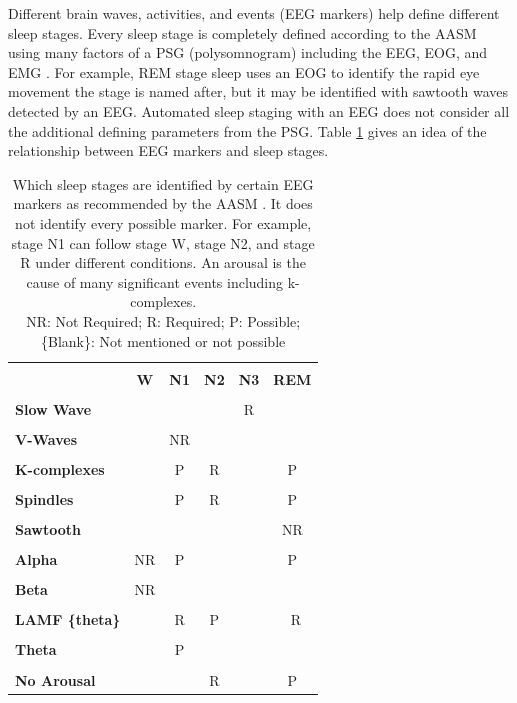 \documentclass[12pt, oneside]{book}
\begin{document}
Different brain waves, activities, and events (EEG markers) help define different sleep stages. Every sleep stage is completely defined according to the AASM using many factors of a PSG (polysomnogram) including the EEG, EOG, and EMG \cite{berry_md_chair_aasm_nodate}. For example, REM stage sleep uses an EOG to identify the rapid eye movement the stage is named after, but it may be identified with sawtooth waves detected by an EEG. Automated sleep staging with an EEG does not consider all the additional defining parameters from the PSG. Table \ref{tab:stagetoWave} gives an idea of the relationship between EEG markers and sleep stages. 

\begin{table}[H]
	{\hspace{0cm}
		\begin{tabular}{|p{3cm}|c|c|c|c|c|}
			\hline \\ [-1.5ex]
			& \textbf{W} & \textbf{N1} & \textbf{N2} & \textbf{N3} & \textbf{REM} \\
			\hline \\ [-1.5ex]
			\textbf{Slow Wave} &  &  &  & R &\\
			\hline \\ [-1.5ex]
			\textbf{V-Waves}  &  & NR &  &  &\\
			\hline \\ [-1.5ex]	 
			\textbf{K-complexes} &  & P & R &  & P\\
			\hline \\ [-1.5ex]
			\textbf{Spindles} &  & P & R &  & P\\
			\hline \\ [-1.5ex]
			\textbf{Sawtooth}&  &  &  &  & NR\\
			\hline \\ [-1.5ex]
			\textbf{Alpha}& NR & P &  &  & P\\
			\hline \\ [-1.5ex]
		    \textbf{Beta} & NR &  &  &  &\\
			\hline \\ [-1.5ex] 
			\textbf{LAMF \{theta\}} &  & R & P &  &  R\\
			\hline \\ [-1.5ex]
			\textbf{Theta} &  & P &  &  & \\
			\hline \\ [-1.5ex]	
			\textbf{No Arousal} &  &  & R &  & P \\
			\hline
		\end{tabular}
	} 
	\caption[Which sleep stages are identified by certain EEG markers as recommended by the AASM \cite{berry_md_chair_aasm_nodate}.]{Which sleep stages are identified by certain EEG markers as recommended by the AASM \cite{berry_md_chair_aasm_nodate}. It does not identify every possible marker. For example, stage N1 can follow stage W, stage N2, and stage R under different conditions. An arousal is the cause of many significant events including k-complexes. \\
	NR: Not Required; R: Required; P: Possible; \{Blank\}: Not mentioned or not possible}
	\label{tab:stagetoWave}
\end{table}
\end{document}
